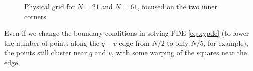\documentclass{article}
\numberwithin{equation}{section}
\theoremstyle{definition}
\begin{document}
\begin{figure}[H]
    \centering
    \hfill
    \hfill
    \caption{Physical grid for $N=21$ and $N=61$, focused on the two inner corners.}
    \label{fig:fig12}
\end{figure}

Even if we change the boundary conditions in solving PDE \eqref{eq:xypde} (to lower the number of points along the $q-v$ edge from $N/2$ to only $N/5$, for example), the points still cluster near $q$ and $v$, with some warping of the squares near the edge.
\end{document}

